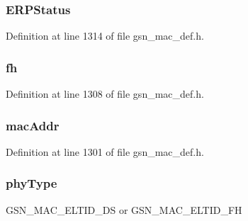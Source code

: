 \hypertarget{a00111_aa2397e8906c266c40c0558894c4be287}{
\subsubsection[{ERPStatus}]{ {\bf ERPStatus}}}
\label{a00111_aa2397e8906c266c40c0558894c4be287}


Definition at line 1314 of file gsn\_\-mac\_\-def.h.

\hypertarget{a00111_acd316070651a9808dda1a0581beaf798}{
\subsubsection[{fh}]{ {\bf fh}}}
\label{a00111_acd316070651a9808dda1a0581beaf798}


Definition at line 1308 of file gsn\_\-mac\_\-def.h.

\hypertarget{a00111_a80d1ca7fb5197906e82d15cda17d3c41}{
\subsubsection[{macAddr}]{ {\bf macAddr}}}
\label{a00111_a80d1ca7fb5197906e82d15cda17d3c41}


Definition at line 1301 of file gsn\_\-mac\_\-def.h.

\hypertarget{a00111_af9a21f0a566cd662139f84bfaf75d662}{
\subsubsection[{phyType}]{ {\bf phyType}}}
\label{a00111_af9a21f0a566cd662139f84bfaf75d662}
GSN\_\-MAC\_\-ELTID\_\-DS or GSN\_\-MAC\_\-ELTID\_\-FH 

